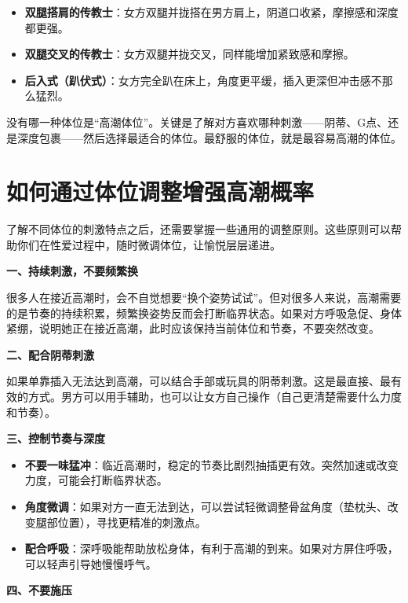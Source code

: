 \documentclass[12pt,UTF8]{ctexbook}
\begin{document}
\begin{itemize}
\item \textbf{双腿搭肩的传教士}：女方双腿并拢搭在男方肩上，阴道口收紧，摩擦感和深度都更强。
\item \textbf{双腿交叉的传教士}：女方双腿并拢交叉，同样能增加紧致感和摩擦。
\item \textbf{后入式（趴伏式）}：女方完全趴在床上，角度更平缓，插入更深但冲击感不那么猛烈。
\end{itemize}

\begin{tcolorbox}[colback=pink!5!white,colframe=red!50!black,title=贴心小叮咛]
没有哪一种体位是“高潮体位”。关键是了解对方喜欢哪种刺激——阴蒂、G点、还是深度包裹——然后选择最适合的体位。最舒服的体位，就是最容易高潮的体位。
\end{tcolorbox}

\section{如何通过体位调整增强高潮概率}

了解不同体位的刺激特点之后，还需要掌握一些通用的调整原则。这些原则可以帮助你们在性爱过程中，随时微调体位，让愉悦层层递进。

\textbf{一、持续刺激，不要频繁换}

很多人在接近高潮时，会不自觉想要“换个姿势试试”。但对很多人来说，高潮需要的是节奏的持续积累，频繁换姿势反而会打断临界状态。如果对方呼吸急促、身体紧绷，说明她正在接近高潮，此时应该保持当前体位和节奏，不要突然改变。

\textbf{二、配合阴蒂刺激}

如果单靠插入无法达到高潮，可以结合手部或玩具的阴蒂刺激。这是最直接、最有效的方式。男方可以用手辅助，也可以让女方自己操作（自己更清楚需要什么力度和节奏）。

\textbf{三、控制节奏与深度}

\begin{itemize}
\item \textbf{不要一味猛冲}：临近高潮时，稳定的节奏比剧烈抽插更有效。突然加速或改变力度，可能会打断临界状态。
\item \textbf{角度微调}：如果对方一直无法到达，可以尝试轻微调整骨盆角度（垫枕头、改变腿部位置），寻找更精准的刺激点。
\item \textbf{配合呼吸}：深呼吸能帮助放松身体，有利于高潮的到来。如果对方屏住呼吸，可以轻声引导她慢慢呼气。
\end{itemize}

\textbf{四、不要施压}
\end{document}
